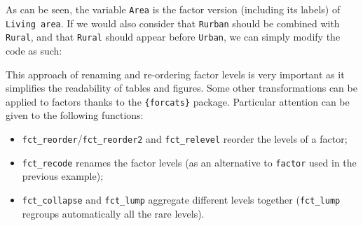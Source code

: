 \documentclass[
]{book}
\newenvironment{Shaded}{\begin{snugshade}}{\end{snugshade}}
\newcommand{\AttributeTok}[1]{\textcolor[rgb]{0.77,0.63,0.00}{#1}}
\newcommand{\DecValTok}[1]{\textcolor[rgb]{0.00,0.00,0.81}{#1}}
\newcommand{\FunctionTok}[1]{\textcolor[rgb]{0.00,0.00,0.00}{#1}}
\newcommand{\NormalTok}[1]{#1}
\newcommand{\OtherTok}[1]{\textcolor[rgb]{0.56,0.35,0.01}{#1}}
\newcommand{\SpecialCharTok}[1]{\textcolor[rgb]{0.00,0.00,0.00}{#1}}
\newcommand{\StringTok}[1]{\textcolor[rgb]{0.31,0.60,0.02}{#1}}
\providecommand{\tightlist}{%
  \setlength{\itemsep}{0pt}\setlength{\parskip}{0pt}}
\begin{document}
As can be seen, the variable \texttt{Area} is the factor version (including its labels) of \texttt{Living\ area}.
If we would also consider that \texttt{Rurban} should be combined with \texttt{Rural}, and that \texttt{Rural} should appear before \texttt{Urban}, we can simply modify the code as such:

\begin{Shaded}
\end{Shaded}

This approach of renaming and re-ordering factor levels is very important as it simplifies the readability of tables and figures.
Some other transformations can be applied to factors thanks to the \texttt{\{forcats\}} package. Particular attention can be given to the following functions:

\begin{itemize}
\tightlist
\item
  \texttt{fct\_reorder}/\texttt{fct\_reorder2} and \texttt{fct\_relevel} reorder the levels of a factor;
\item
  \texttt{fct\_recode} renames the factor levels (as an alternative to \texttt{factor} used in the previous example);
\item
  \texttt{fct\_collapse} and \texttt{fct\_lump} aggregate different levels together (\texttt{fct\_lump} regroups automatically all the rare levels).
\end{itemize}
\end{document}
